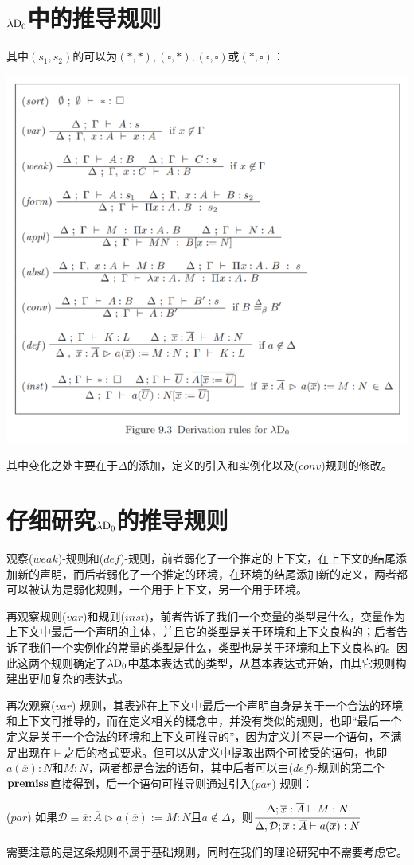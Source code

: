 \documentclass[UTF8]{article}
\begin{document}
	\section{$\lambda{\rm D_0}$中的推导规则}
	\noindent
	其中$(s_1,s_2)$的可以为$(*,*),(\square,*),(\square,\square)$或$(*,\square)$：
	
		\noindent
		\includegraphics[width=0.93\linewidth]{"../imgs/9-3.png"}
		
		其中变化之处主要在于$\Delta$的添加，定义的引入和实例化以及($conv$)规则的修改。
		
	\section{仔细研究$\lambda{\rm D_0}$的推导规则}
	\noindent
	观察($weak$)-规则和($def$)-规则，前者弱化了一个推定的上下文，在上下文的结尾添加新的声明，而后者弱化了一个推定的环境，在环境的结尾添加新的定义，两者都可以被认为是弱化规则，一个用于上下文，另一个用于环境。
	
		再观察规则($var$)和规则($inst$)，前者告诉了我们一个变量的类型是什么，变量作为上下文中最后一个声明的主体，并且它的类型是关于环境和上下文良构的；后者告诉了我们一个实例化的常量的类型是什么，类型也是关于环境和上下文良构的。因此这两个规则确定了$\lambda{\rm D_0}$中基本表达式的类型，从基本表达式开始，由其它规则构建出更加复杂的表达式。
		
		再次观察($var$)-规则，其表述在上下文中最后一个声明自身是关于一个合法的环境和上下文可推导的，而在定义相关的概念中，并没有类似的规则，也即“最后一个定义是关于一个合法的环境和上下文可推导的”，因为定义并不是一个语句，不满足出现在$\vdash$之后的格式要求。但可以从定义中提取出两个可接受的语句，也即$a(\overline{x}):N$和$M:N$，两者都是合法的语句，其中后者可以由($def$)-规则的第二个$\bf premiss$直接得到，后一个语句可推导则通过引入($par$)-规则：
		
		($par$) 如果$\mathcal{D}\equiv\overline{x}:\overline{A}\triangleright a(\overline{x}):=M:N$且$a\notin\Delta$，则$\cfrac{\Delta;\overline{x}:\overline{A}\vdash M:N}{\Delta,\mathcal{D};\overline{x}:\overline{A}\vdash a(\overline{x}):N}$
		
		需要注意的是这条规则不属于基础规则，同时在我们的理论研究中不需要考虑它。
\end{document}
